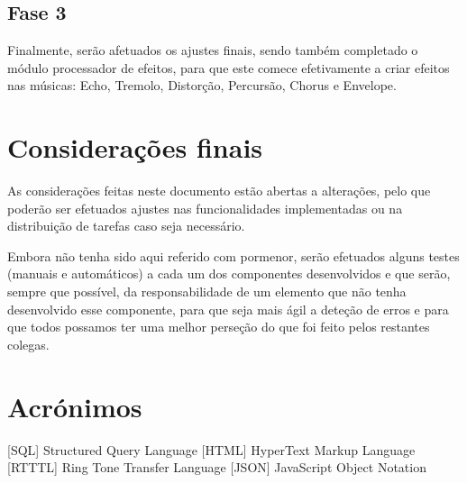 \documentclass{report}
\begin{document}
\section{Fase 3}
Finalmente, serão afetuados os ajustes finais, sendo também completado o módulo processador de efeitos, para que este comece efetivamente a criar efeitos nas músicas: Echo, Tremolo, Distorção, Percursão, Chorus e Envelope.

\chapter{Considerações finais}
\label{chap.finais}

As considerações feitas neste documento estão abertas a alterações, pelo que poderão ser efetuados ajustes nas funcionalidades implementadas ou na distribuição de tarefas caso seja necessário.

Embora não tenha sido aqui referido com pormenor, serão efetuados alguns testes (manuais e automáticos) a cada um dos componentes desenvolvidos e que serão, sempre que possível, da responsabilidade de um elemento que não tenha desenvolvido esse componente, para que seja mais ágil a deteção de erros e para que todos possamos ter uma melhor perseção do que foi feito pelos restantes colegas.


\chapter*{Acrónimos}
\begin{acronym}
[SQL] {Structured Query Language}
 [HTML] {HyperText Markup Language}
 [RTTTL] {Ring Tone Transfer Language}
 [JSON] {JavaScript Object Notation}

\end{acronym}


\printbibliography
\end{document}
